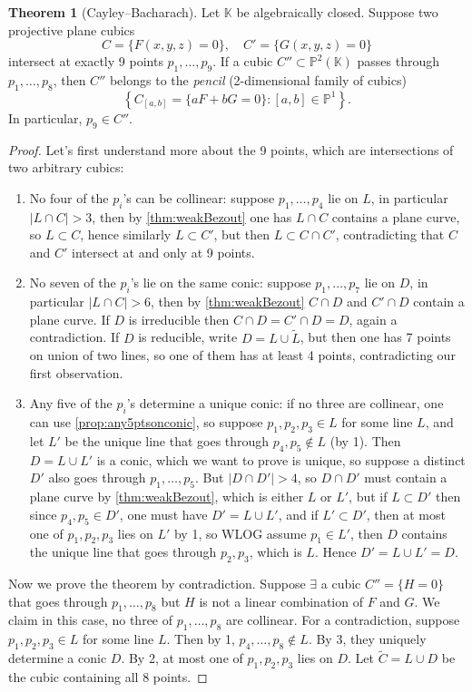 \documentclass{article}
\newcommand{\K}{\mathbb{K}}
\newcommand{\p}{\mathbb{P}}
\theoremstyle{definition}
\newtheorem{thm}[defn]{Theorem}
\begin{document}
\begin{thm}[Cayley--Bacharach]
Let $\K$ be algebraically closed. Suppose two projective plane cubics
\[
C=\{F(x,y,z)=0\},\quad C'=\{G(x,y,z)=0\}
\]
intersect at exactly 9 points $p_1,\ldots,p_9$. If a cubic $C''\subset\p^2(\K)$ passes through $p_1,\ldots,p_8$, then $C''$ belongs to the \textit{pencil} (2-dimensional family of cubics)
\[
\left\{C_{[a,b]}=\{aF+bG=0\}:[a,b]\in\p^1\right\}.
\]
In particular, $p_9\in C''$.
\end{thm}
\begin{proof}
Let's first understand more about the 9 points, which are intersections of two arbitrary cubics:
\begin{enumerate}
\item No four of the $p_i$'s can be collinear: suppose $p_1,\ldots,p_4$ lie on $L$, in particular $|L\cap C|>3$, then by \ref{thm:weakBezout} one has $L\cap C$ contains a plane curve, so $L\subset C$, hence similarly $L\subset C'$, but then $L\subset C\cap C'$, contradicting that $C$ and $C'$ intersect at and only at 9 points.
\item No seven of the $p_i$'s lie on the same conic: suppose $p_1,\ldots,p_7$ lie on $D$, in particular $|L\cap C|>6$, then by \ref{thm:weakBezout} $C\cap D$ and $C'\cap D$ contain a plane curve. If $D$ is irreducible then $C\cap D=C'\cap D=D$, again a contradiction. If $D$ is reducible, write $D=L\cup\widetilde L$, but then one has 7 points on union of two lines, so one of them has at least 4 points, contradicting our first observation.
\item Any five of the $p_i$'s determine a unique conic: if no three are collinear, one can use \ref{prop:any5ptsonconic}, so suppose $p_1,p_2,p_3\in L$ for some line $L$, and let $L'$ be the unique line that goes through $p_4,p_5\notin L$ (by 1). Then $D=L\cup L'$ is a conic, which we want to prove is unique, so suppose a distinct $D'$ also goes through $p_1,\ldots,p_5$. But $|D\cap D'|>4$, so $D\cap D'$ must contain a plane curve by \ref{thm:weakBezout}, which is either $L$ or $L'$, but if $L\subset D'$ then since $p_4,p_5\in D'$, one must have $D'=L\cup L'$, and if $L'\subset D'$, then at most one of $p_1,p_2,p_3$ lies on $L'$ by 1, so WLOG assume $p_1\in L'$, then $D$ contains the unique line that goes through $p_2,p_3$, which is $L$. Hence $D'=L\cup L'=D$.
\end{enumerate}
Now we prove the theorem by contradiction. Suppose $\exists$ a cubic $C''=\{H=0\}$ that goes through $p_1,\ldots,p_8$ but $H$ is not a linear combination of $F$ and $G$. We claim in this case, no three of $p_1,\ldots,p_8$ are collinear. For a contradiction, suppose $p_1,p_2,p_3\in L$ for some line $L$. Then by 1, $p_4,\ldots,p_8\notin L$. By 3, they uniquely determine a conic $D$. By 2, at most one of $p_1,p_2,p_3$ lies on $D$. Let $\widetilde C=L\cup D$ be the cubic containing all 8 points.


\end{proof}
\end{document}
